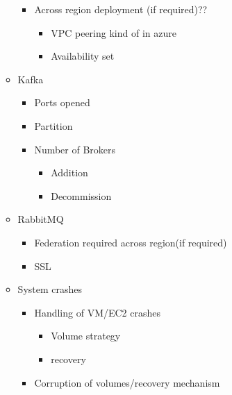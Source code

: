\documentclass[letterpaper,10pt,english]{sphinxmanual}
\begin{document}
\begin{enumerate}
\begin{itemize}
\begin{itemize}
\item {} 
Across region deployment (if required)??
\begin{itemize}
\item {} 
VPC peering kind of in azure

\item {} 
Availability set

\end{itemize}

\end{itemize}

\item {} 
Kafka
\begin{itemize}
\item {} 
Ports opened

\item {} 
Partition

\item {} 
Number of Brokers
\begin{itemize}
\item {} 
Addition

\item {} 
Decommission

\end{itemize}

\end{itemize}

\item {} 
RabbitMQ
\begin{itemize}
\item {} 
Federation required across region(if required)

\item {} 
SSL

\end{itemize}

\item {} 
System crashes
\begin{itemize}
\item {} 
Handling of VM/EC2 crashes
\begin{itemize}
\item {} 
Volume strategy

\item {} 
recovery

\end{itemize}

\item {} 
Corruption of volumes/recovery mechanism

\end{itemize}


\end{itemize}
\end{enumerate}
\end{document}
